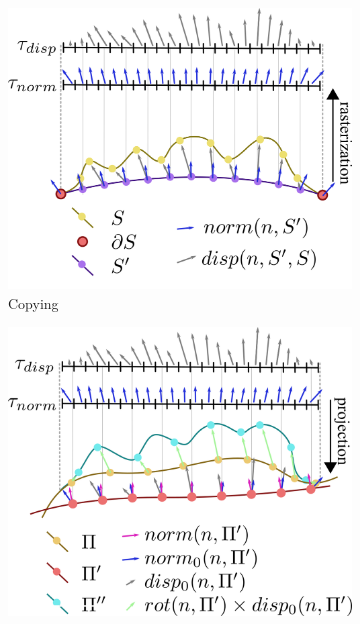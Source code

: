 \begin{figure}[t!]
    \centering
    \begin{subfigure}[b]{0.48\linewidth}
    \centering
    \includegraphics[width=\textwidth]{images/fluidsculpting-mig2016/displacement_copy_2.png}
    \caption{\label{fig:displacement:copy}Copying}
    \end{subfigure}
    \hspace{0.1cm}
    \begin{subfigure}[b]{0.48\linewidth}
    \centering
    \includegraphics[width=\textwidth]{images/fluidsculpting-mig2016/displacement_paste_2.png}

\end{subfigure}
\end{figure}
